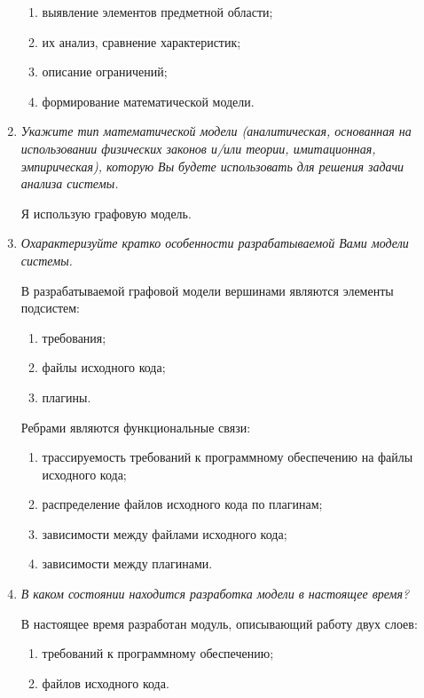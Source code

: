 \documentclass{article}
\begin{document}
\begin{enumerate}
        \begin{enumerate}
            \item выявление элементов предметной области;
            \item их анализ, сравнение характеристик;
            \item описание ограничений;
            \item формирование математической модели. 
        \end{enumerate}

        \item \textit{Укажите тип математической модели (аналитическая, основанная на использовании физических законов и/или теории, имитационная, эмпирическая), которую Вы будете использовать для решения задачи анализа системы.}

        Я использую графовую модель.

        \item \textit{Охарактеризуйте кратко особенности разрабатываемой Вами модели системы.}

        В разрабатываемой графовой модели вершинами являются элементы подсистем:
        \begin{enumerate}
            \item требования;
            \item файлы исходного кода;
            \item плагины.
        \end{enumerate}

        Ребрами являются функциональные связи:
        \begin{enumerate}
            \item трассируемость требований к программному обеспечению на файлы исходного кода;
            \item распределение файлов исходного кода по плагинам;
            \item зависимости между файлами исходного кода;
            \item зависимости между плагинами.
        \end{enumerate}

        \item \textit{В каком состоянии находится разработка модели в настоящее время?}

        В настоящее время разработан модуль, описывающий работу двух слоев:
        \begin{enumerate}
            \item требований к программному обеспечению;
            \item файлов исходного кода.
        \end{enumerate}


\end{enumerate}
\end{document}
